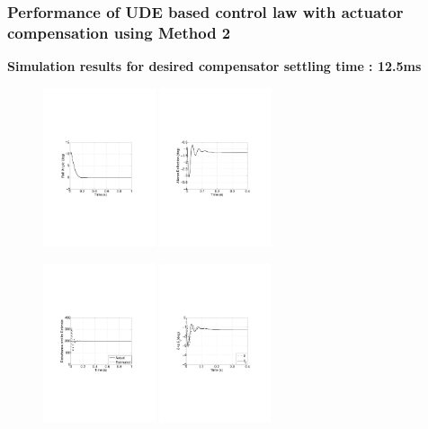 \documentclass[table,10pt,red]{beamer}	%
\begin{document}
\begin{frame}
\frametitle{Performance of UDE based control law with actuator compensation using Method 2}
\textbf{Simulation results for desired compensator settling time : 12.5ms}
\begin{figure}[h]
\includegraphics[width=3.3cm]{fig10a}
\includegraphics[width=3.3cm]{fig10b}
\end{figure}
\begin{figure}
\includegraphics[width=3.3cm]{fig10c}
\includegraphics[width=3.3cm]{fig10d}
\end{figure}
\end{frame}
\end{document}
